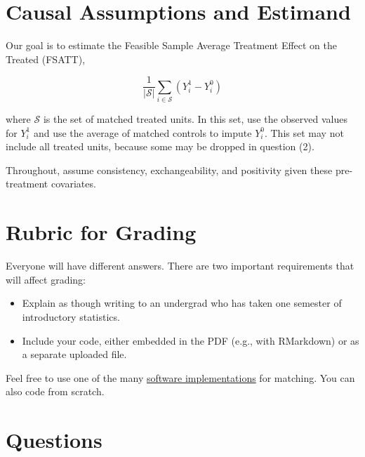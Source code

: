 \documentclass[10pt]{article}
\begin{document}
\section*{Causal Assumptions and Estimand}

Our goal is to estimate the Feasible Sample Average Treatment Effect on the Treated (FSATT),

$$\frac{1}{\lvert \mathcal{S}\rvert} \sum_{i\in\mathcal{S}}\left(Y_i^1 - Y_i^0\right)$$

where $\mathcal{S}$ is the set of matched treated units. In this set, use the observed values for $Y_i^1$ and use the average of matched controls to impute $Y_i^0$. This set may not include all treated units, because some may be dropped in question (2).

Throughout, assume consistency, exchangeability, and positivity given these pre-treatment covariates.

\section*{Rubric for Grading}

Everyone will have different answers. There are two important requirements that will affect grading:
\begin{itemize}
    \item Explain as though writing to an undergrad who has taken one semester of introductory statistics.
    \item Include your code, either embedded in the PDF (e.g., with RMarkdown) or as a separate uploaded file.
\end{itemize}

Feel free to use one of the many \href{https://www.biostat.jhsph.edu/~estuart/propensityscoresoftware.html}{software implementations} for matching. You can also code from scratch.

\section*{Questions}
\end{document}
